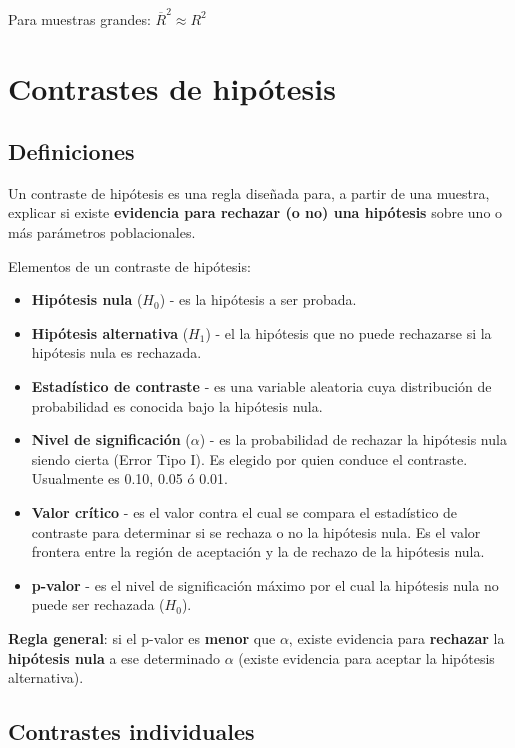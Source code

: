 \documentclass[10pt, a4paper, landscape]{extarticle}
\begin{document}
\begin{multicols}{3}
Para muestras grandes: $\overline{R}^2 \approx R^2$

\section*{Contrastes de hipótesis}

\subsection*{Definiciones}

Un contraste de hipótesis es una regla diseñada para, a partir de una muestra, explicar si existe \textbf{evidencia para rechazar (o no) una hipótesis} sobre uno o más parámetros poblacionales.

Elementos de un contraste de hipótesis:

\begin{itemize}[leftmargin=*]
	\item \textbf{Hipótesis nula} ($H_0$) - es la hipótesis a ser probada.
	\item \textbf{Hipótesis alternativa} ($H_1$) - el la hipótesis que no puede rechazarse si la hipótesis nula es rechazada.
	\item \textbf{Estadístico de contraste} - es una variable aleatoria cuya distribución de probabilidad es conocida bajo la hipótesis nula.
	\item \textbf{Nivel de significación} ($\alpha$) - es la probabilidad de rechazar la hipótesis nula siendo cierta (Error Tipo I). Es elegido por quien conduce el contraste. Usualmente es 0.10, 0.05 ó 0.01.
	\item \textbf{Valor crítico} - es el valor contra el cual se compara el estadístico de contraste para determinar si se rechaza o no la hipótesis nula. Es el valor frontera entre la región de aceptación y la de rechazo de la hipótesis nula.
	\item \textbf{p-valor} - es el nivel de significación máximo por el cual la hipótesis nula no puede ser rechazada ($H_0$).
\end{itemize}

\textbf{Regla general}: si el p-valor es \textbf{menor} que $\alpha$, existe evidencia para \textbf{rechazar} la \textbf{hipótesis nula} a ese determinado $\alpha$ (existe evidencia para aceptar la hipótesis alternativa).

\subsection*{Contrastes individuales}


\end{multicols}
\end{document}

